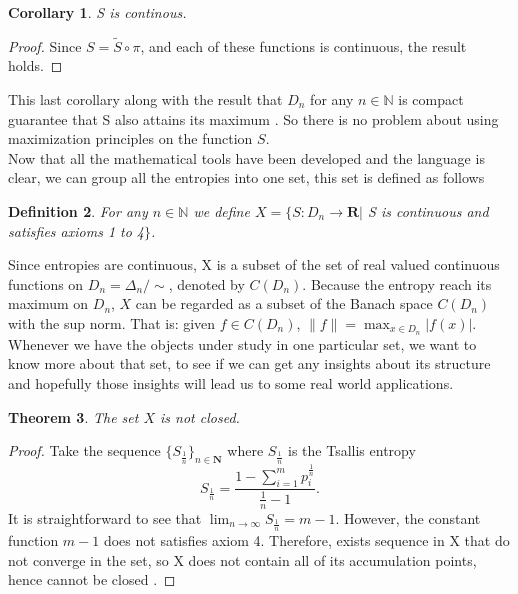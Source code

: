 \documentclass[11pt]{article}
\theoremstyle{plain}
\newtheorem{theorem}{Theorem}[section]
\newtheorem{corollary}[theorem]{Corollary}
\newtheorem{definition}[theorem]{Definition}
\begin{document}
\begin{corollary}\label{cor:continous}
S is continous.
\end{corollary}
\begin{proof}
Since $S=\tilde{S}\circ\pi$, and each of these functions is continuous, the result holds.
\end{proof}

This last corollary along with the result that $D_{n}$ for any $n\in\mathbb{N}$ is compact
guarantee that S also attains its maximum \cite{Zeidlernonlinear}.
So there is  no problem about using  maximization principles on the function $S$.\medskip
\\
Now that   all the mathematical  tools have been developed and the language is clear, we can group all the entropies into one set, this set is defined as follows

\begin{definition}
For any $n \in \mathbb{N}$ we define $X=\{ S:D_{n}\rightarrow
\mathbf{R}|$ S is continuous and satisfies axioms 1 to 4$\}$.
\end{definition}


Since entropies are continuous, X is a subset
of the set of real valued continuous functions on $D_{n}=\Delta_{n}/\sim$,
denoted by $C(D_{n})$. Because the entropy reach its maximum on $D_{n}$, $X$
can be regarded as a subset of the Banach space $C(D_{n})$ with the
sup norm. That is: given $f\in C(D_{n})$, $\|f\|=\max_{x\in D_{n}}
|f(x)|$\cite{rudin}. 
\newline
\\
Whenever we have the objects under study in one particular set, we want to know more about that set, to see if we can get any insights about its structure and hopefully those insights will lead us to some real world applications.

\begin{theorem}\label{thm:notclosed}
The set $X$ is not closed.
\end{theorem}

\begin{proof}
Take the sequence $\{S_{\frac{1}{n}}\}_{n \in \mathbf{N}}$ where
$S_{\frac{1}{n}}$ is the Tsallis entropy
\begin{equation}
S_{\frac{1}{n}}=\frac{1-\sum_{i=1}^{m}
p_{i}^{\frac{1}{n}}}{\frac{1}{n}-1}.
\end{equation}
It is straightforward to see that $\lim_{n \to \infty}
S_{\frac{1}{n}}=m-1$. However, the constant  function $m-1$ does not satisfies
axiom 4. Therefore, exists sequence in X that do not converge in
the set, so X does not contain all of its accumulation points,
hence cannot be closed \cite{Rubiano, Janich}.
\end{proof}
\end{document}
